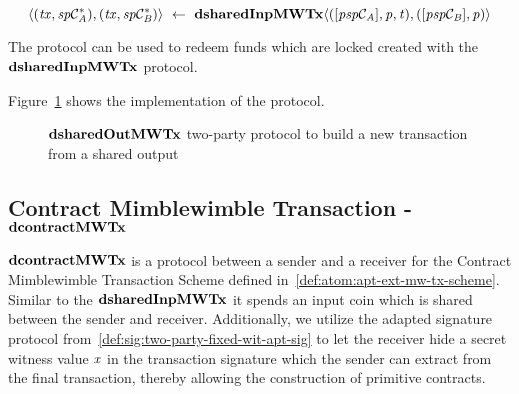 \[ \langle (\mathit{tx}, \mathit{sp}\mathcal{C}_{\mathit{A}}^*), (\mathit{tx}, \mathit{sp}\mathcal{C}_{\mathit{B}}^*) \rangle ~\leftarrow~ \mathbf{dsharedInpMWTx} \langle([\mathit{psp}\mathcal{C}_{\mathit{A}}],\mathit{p},\mathit{t}), ([\mathit{psp}\mathcal{C}_{\mathit{B}}],\mathit{p}) \rangle \]

The protocol can be used to redeem funds which are locked created with the $\mathbf{dsharedInpMWTx}$ protocol.

Figure~\cref{fig:d-shared-inp-mw-tx} shows the implementation of the protocol.

\begin{figure}
    \caption{$\mathbf{dsharedOutMWTx}$ two-party protocol to build a new transaction from a shared output} \label{fig:d-shared-inp-mw-tx}
\end{figure}

\subsection{Contract Mimblewimble Transaction - $\mathbf{dcontractMWTx}$} \label{subsec:atom:script-mw-tx}

$\mathbf{dcontractMWTx}$ is a protocol between a sender and a receiver for the Contract Mimblewimble Transaction Scheme defined in~\cref{def:atom:apt-ext-mw-tx-scheme}.
Similar to the $\mathbf{dsharedInpMWTx}$ it spends an input coin which is shared between the sender and receiver.
Additionally, we utilize the adapted signature protocol from~\cref{def:sig:two-party-fixed-wit-apt-sig} to let the receiver hide a secret witness value $\mathit{x}$ in the transaction signature which the sender can extract from the final transaction, thereby allowing the construction of primitive contracts.

